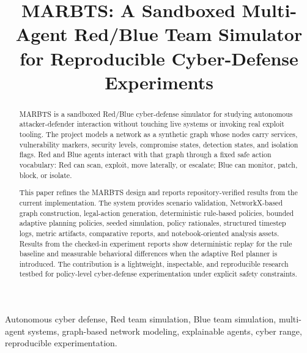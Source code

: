 \documentclass[conference]{IEEEtran}
\begin{document}
\title{MARBTS: A Sandboxed Multi-Agent Red/Blue Team Simulator for Reproducible Cyber-Defense Experiments}

\author{
}
\maketitle

\begin{abstract}
MARBTS is a sandboxed Red/Blue cyber-defense simulator for studying autonomous attacker-defender interaction without touching live systems or invoking real exploit tooling. The project models a network as a synthetic graph whose nodes carry services, vulnerability markers, security levels, compromise states, detection states, and isolation flags. Red and Blue agents interact with that graph through a fixed safe action vocabulary: Red can scan, exploit, move laterally, or escalate; Blue can monitor, patch, block, or isolate.

This paper refines the MARBTS design and reports repository-verified results from the current implementation. The system provides scenario validation, NetworkX-based graph construction, legal-action generation, deterministic rule-based policies, bounded adaptive planning policies, seeded simulation, policy rationales, structured timestep logs, metric artifacts, comparative reports, and notebook-oriented analysis assets. Results from the checked-in experiment reports show deterministic replay for the rule baseline and measurable behavioral differences when the adaptive Red planner is introduced. The contribution is a lightweight, inspectable, and reproducible research testbed for policy-level cyber-defense experimentation under explicit safety constraints.
\end{abstract}

\begin{IEEEkeywords}
Autonomous cyber defense, Red team simulation, Blue team simulation, multi-agent systems, graph-based network modeling, explainable agents, cyber range, reproducible experimentation.
\end{IEEEkeywords}
\end{document}
